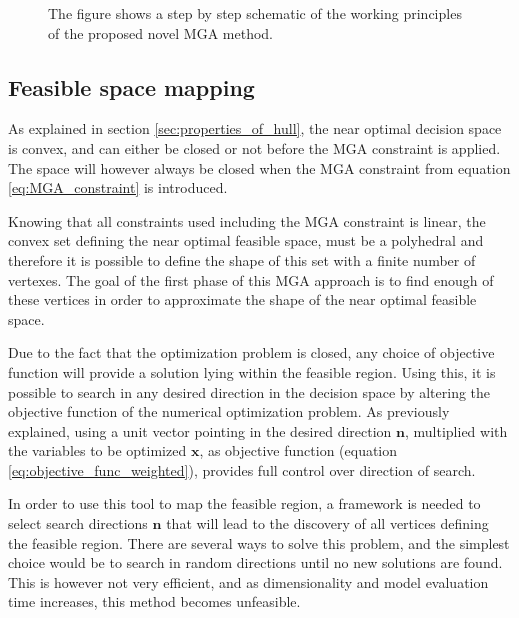 \begin{figure}[p]
	\centering
	\caption{The figure shows a step by step schematic of the working principles of the proposed novel MGA method.}
	\label{fig:step_by_step}
\end{figure}

\subsection{Feasible space mapping}
As explained in section \ref{sec:properties_of_hull}, the near optimal decision space is convex, and can either be closed or not before the MGA constraint is applied. The space will however always be closed when the MGA constraint from equation \ref{eq:MGA_constraint} is introduced.

Knowing that all constraints used including the MGA constraint is linear, the convex set defining the near optimal feasible space, must be a polyhedral and therefore it is possible to define the shape of this set with a finite number of vertexes. The goal of the first phase of this MGA approach is to find enough of these vertices in order to approximate the shape of the near optimal feasible space. 

Due to the fact that the optimization problem is closed, any choice of objective function will provide a solution lying within the feasible region. Using this, it is possible to search in any desired direction in the decision space by altering the objective function of the numerical optimization problem. As previously explained, using a unit vector pointing in the desired direction $\mathbf{n}$, multiplied with the variables to be optimized $\mathbf{x}$, as objective function (equation \ref{eq:objective_func_weighted}), provides full control over direction of search. 


In order to use this tool to map the feasible region, a framework is needed to select search directions $\mathbf{n}$ that will lead to the discovery of all vertices defining the feasible region. There are several ways to solve this problem, and the simplest choice would be to search in random directions until no new solutions are found. This is however not very efficient, and as dimensionality and model evaluation time increases, this method becomes unfeasible. 

